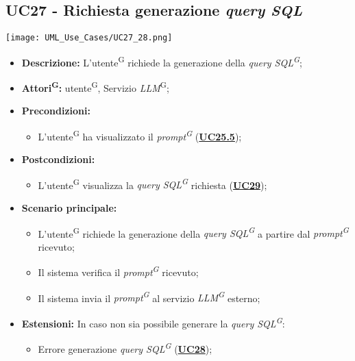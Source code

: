 \subsection{UC27 - Richiesta generazione \textit{query SQL}}
\label{sec:UC27}
\texttt{[image: UML\_Use\_Cases/UC27\_28.png]}
\begin{itemize}
    \item \textbf{Descrizione:} L'utente\textsuperscript{G} richiede la generazione della \textit{query SQL\textsuperscript{G}};
    \item \textbf{Attori\textsuperscript{G}:} utente\textsuperscript{G}, Servizio \textit{LLM}\textsuperscript{G};
    \item \textbf{Precondizioni:} 
    \begin{itemize}
    	\item L'utente\textsuperscript{G} ha visualizzato il \textit{prompt\textsuperscript{G}} (\hyperref[sec:UC255]{\textbf{UC25.5}});
    \end{itemize}
    \item \textbf{Postcondizioni:} 
    \begin{itemize}
    	\item L'utente\textsuperscript{G} visualizza la \textit{query SQL\textsuperscript{G}} richiesta (\hyperref[sec:UC29]{\textbf{UC29}});
    \end{itemize}
    \item \textbf{Scenario principale:}
    \begin{itemize}
    	\item L'utente\textsuperscript{G} richiede la generazione della \textit{query SQL\textsuperscript{G}} a partire dal \textit{prompt\textsuperscript{G}} ricevuto;
    	\item Il sistema verifica il \textit{prompt\textsuperscript{G}} ricevuto;
    	\item Il sistema invia il \textit{prompt\textsuperscript{G}} al servizio \textit{LLM\textsuperscript{G}} esterno;
    \end{itemize}
    \item \textbf{Estensioni:} In caso non sia possibile generare la \textit{query SQL\textsuperscript{G}}:
    \begin{itemize}
    	\item Errore generazione \textit{query SQL\textsuperscript{G}} (\hyperref[sec:UC28]{\textbf{UC28}});
    \end{itemize}
\end{itemize}

